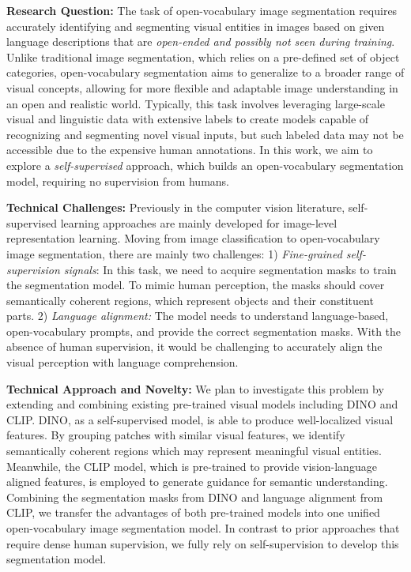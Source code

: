 \noindent\textbf{Research Question:}
The task of open-vocabulary image segmentation requires accurately identifying and segmenting visual entities in images based on given language descriptions that are \emph{open-ended and possibly not seen during training}. Unlike traditional image segmentation, which relies on a pre-defined set of object categories, open-vocabulary segmentation aims to generalize to a broader range of visual concepts, allowing for more flexible and adaptable image understanding in an open and realistic world. Typically, this task involves leveraging large-scale visual and linguistic data with extensive labels to create models capable of recognizing and segmenting novel visual inputs, but such labeled data may not be accessible due to the expensive human annotations. In this work, we aim to explore a \emph{self-supervised} approach, which builds an open-vocabulary segmentation model, requiring no supervision from humans.

\noindent\textbf{Technical Challenges:}
Previously in the computer vision literature, self-supervised learning approaches are mainly developed for image-level representation learning. Moving from image classification to open-vocabulary image segmentation, there are mainly two challenges: 1) \emph{Fine-grained self-supervision signals}: In this task, we need to acquire segmentation masks to train the segmentation model. To mimic human perception, the masks should cover semantically coherent regions, which represent objects and their constituent parts. 2) \emph{Language alignment:} The model needs to understand language-based, open-vocabulary prompts, and provide the correct segmentation masks. With the absence of human supervision, it would be challenging to accurately align the visual perception with language comprehension.

\noindent\textbf{Technical Approach and Novelty:}
We plan to investigate this problem by extending and combining existing pre-trained visual models including DINO and CLIP. DINO, as a self-supervised model, is able to produce well-localized visual features. By grouping patches with similar visual features, we identify semantically coherent regions which may represent meaningful visual entities. Meanwhile, the CLIP model, which is pre-trained to provide vision-language aligned features, is employed to generate guidance for semantic understanding. Combining the segmentation masks from DINO and language alignment from CLIP, we transfer the advantages of both pre-trained models into one unified open-vocabulary image segmentation model. In contrast to prior approaches that require dense human supervision, we fully rely on self-supervision to develop this segmentation model.

